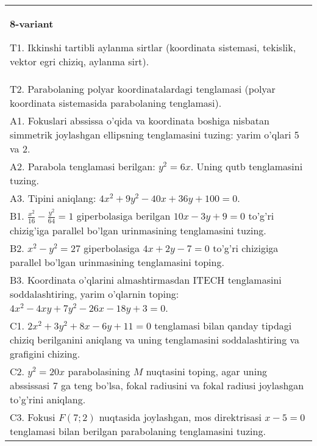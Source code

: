\documentclass{article}
\begin{document}
\begin{tabular}{m{17cm}}
\textbf{8-variant}
\newline

T1. Ikkinshi tartibli aylanma sirtlar (koordinata sistemasi, tekislik, vektor egri chiziq, aylanma sirt).\\

T2. Parabolaning polyar koordinatalardagi tenglamasi (polyar koordinata sistemasida parabolaning tenglamasi).\\

A1. Fokuslari abssissa o'qida va koordinata boshiga nisbatan simmetrik joylashgan ellipsning tenglamasini tuzing: yarim o'qlari 5 va 2.\\

A2. Parabola tenglamasi berilgan: $y^2=6x$. Uning qutb tenglamasini tuzing.\\

A3. Tipini aniqlang: $4x^2+9y^2-40x+36y+100=0$.\\

B1. $\frac{x^{2}}{16} - \frac{y^{2}}{64} = 1$ giperbolasiga berilgan $10x - 3y + 9 = 0$ to'g'ri chizig'iga parallel bo'lgan urinmasining tenglamasini tuzing.  \\

B2. $x^{2} - y^{2} = 27$ giperbolasiga $4x + 2y - 7 = 0$ to'g'ri chizigiga parallel bo'lgan urinmasining tenglamasini toping.  \\

B3. Koordinata o'qlarini almashtirmasdan ITECH tenglamasini soddalashtiring, yarim o'qlarnin toping: $4x^{2} - 4xy + 7y^{2} - 26x - 18y + 3 = 0$.\\

C1. $2x^{2} + 3y^{2} + 8x - 6y + 11 = 0$ tenglamasi bilan qanday tipdagi chiziq berilganini aniqlang va uning tenglamasini soddalashtiring va grafigini chizing.  \\

C2. $y^{2} = 20x$ parabolasining $M$ nuqtasini toping, agar uning abssissasi 7 ga teng bo'lsa, fokal radiusini va fokal radiusi joylashgan to'g'rini aniqlang.\\

C3. Fokusi $F(7;2)$ nuqtasida joylashgan, mos direktrisasi $x - 5 = 0$ tenglamasi bilan berilgan parabolaning tenglamasini tuzing.  \\

\end{tabular}
\vspace{1cm}
\end{document}
